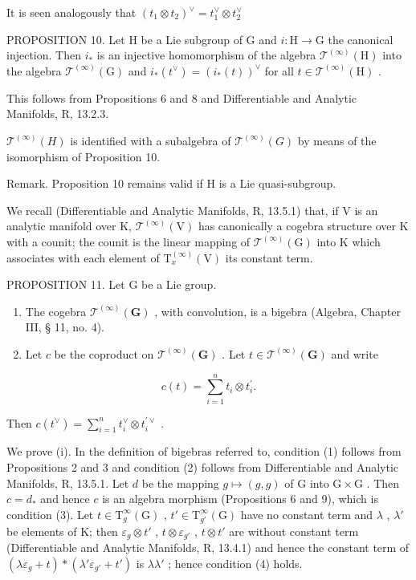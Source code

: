 It is seen analogously that \((t_1\otimes t_2)^\vee = t_1^\vee \otimes t_2^\vee\)

PROPOSITION 10. Let H be a Lie subgroup of G and \(i: \mathrm{H} \to \mathrm{G}\) the canonical injection. Then \(i_*\) is an injective homomorphism of the algebra \(\mathcal{T}^{(\infty)}(\mathrm{H})\) into the algebra \(\mathcal{T}^{(\infty)}(\mathrm{G})\) and \(i_*(t^\vee) = (i_*(t))^{\vee}\) for all \(t \in \mathcal{T}^{(\infty)}(\mathrm{H})\) .

This follows from Propositions 6 and 8 and Differentiable and Analytic Manifolds, R, 13.2.3.

\(\mathcal{T}^{(\infty)}(H)\) is identified with a subalgebra of \(\mathcal{T}^{(\infty)}(G)\) by means of the isomorphism of Proposition 10.

Remark. Proposition 10 remains valid if H is a Lie quasi-subgroup.

We recall (Differentiable and Analytic Manifolds, R, 13.5.1) that, if V is an analytic manifold over K, \(\mathcal{T}^{(\infty)}(\mathrm{V})\) has canonically a cogebra structure over K with a counit; the counit is the linear mapping of \(\mathcal{T}^{(\infty)}(\mathrm{G})\) into K which associates with each element of \(\mathrm{T}_x^{(\infty)}(\mathrm{V})\) its constant term.

PROPOSITION 11. Let G be a Lie group.

\begin{enumerate}
\def\labelenumi{(\roman{enumi})}
\item
  The cogebra \(\mathcal{T}^{(\infty)}(\mathbf{G})\) , with convolution, is a bigebra (Algebra, Chapter III, § 11, no. 4).
\item
  Let \(c\) be the coproduct on \(\mathcal{T}^{(\infty)}(\mathbf{G})\) . Let \(t \in \mathcal{T}^{(\infty)}(\mathbf{G})\) and write
\end{enumerate}

\[
c (t) = \sum_ {i = 1} ^ {n} t _ {i} \otimes t _ {i} ^ {\prime}.
\]

Then \(c(t^{\vee}) = \sum_{i=1}^{n} t_{i}^{\vee} \otimes t_{i}^{\prime\vee}\) .

We prove (i). In the definition of bigebras referred to, condition (1) follows from Propositions 2 and 3 and condition (2) follows from Differentiable and Analytic Manifolds, R, 13.5.1. Let \(d\) be the mapping \(g \mapsto (g, g)\) of G into \(\mathrm{G} \times \mathrm{G}\) . Then \(c = d_{*}\) and hence \(c\) is an algebra morphism (Propositions 6 and 9), which is condition (3). Let \(t \in \mathrm{T}_{g}^{\infty}(\mathrm{G})\) , \(t' \in \mathrm{T}_{g'}^{\infty}(\mathrm{G})\) have no constant term and \(\lambda\) , \(\lambda'\) be elements of K; then \(\varepsilon_{g} \otimes t'\) , \(t \otimes \varepsilon_{g'}\) , \(t \otimes t'\) are without constant term (Differentiable and Analytic Manifolds, R, 13.4.1) and hence the constant term of \((\lambda\varepsilon_{g} + t) * (\lambda' \varepsilon_{g'} + t')\) is \(\lambda\lambda'\) ; hence condition (4) holds.

